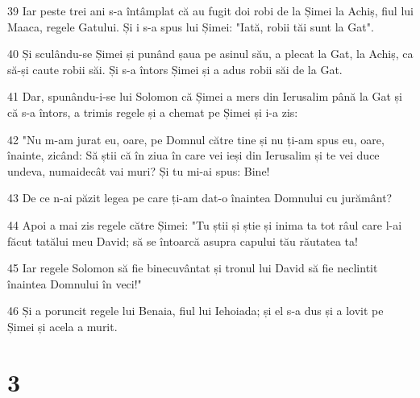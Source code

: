 \par 39 Iar peste trei ani s-a întâmplat că au fugit doi robi de la Șimei la Achiș, fiul lui Maaca, regele Gatului. Și i s-a spus lui Șimei: "Iată, robii tăi sunt la Gat".
\par 40 Și sculându-se Șimei și punând șaua pe asinul său, a plecat la Gat, la Achiș, ca să-și caute robii săi. Și s-a întors Șimei și a adus robii săi de la Gat.
\par 41 Dar, spunându-i-se lui Solomon că Șimei a mers din Ierusalim până la Gat și că s-a întors, a trimis regele și a chemat pe Șimei și i-a zis:
\par 42 "Nu m-am jurat eu, oare, pe Domnul către tine și nu ți-am spus eu, oare, înainte, zicând: Să știi că în ziua în care vei ieși din Ierusalim și te vei duce undeva, numaidecât vai muri? Și tu mi-ai spus: Bine!
\par 43 De ce n-ai păzit legea pe care ți-am dat-o înaintea Domnului cu jurământ?
\par 44 Apoi a mai zis regele către Șimei: "Tu știi și știe și inima ta tot râul care l-ai făcut tatălui meu David; să se întoarcă asupra capului tău răutatea ta!
\par 45 Iar regele Solomon să fie binecuvântat și tronul lui David să fie neclintit înaintea Domnului în veci!"
\par 46 Și a poruncit regele lui Benaia, fiul lui Iehoiada; și el s-a dus și a lovit pe Șimei și acela a murit.

\chapter{3}

